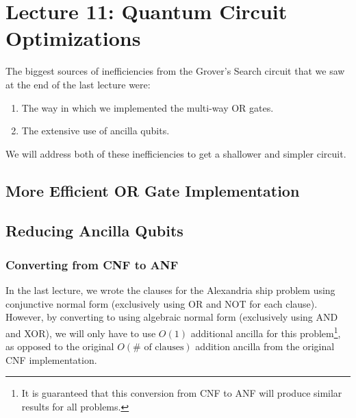 \section{Lecture 11: Quantum Circuit Optimizations}\label{sec:lecture11}

The biggest sources of inefficiencies from the Grover's Search circuit that
we saw at the end of the last lecture were:

\begin{enumerate}
  \item The way in which we implemented the multi-way OR gates.

  \item The extensive use of ancilla qubits.
\end{enumerate}

We will address both of these inefficiencies to get a shallower and simpler
circuit.

\subsection*{More Efficient OR Gate Implementation}


\subsection*{Reducing Ancilla Qubits}

\subsubsection*{Converting from CNF to ANF}

In the last lecture, we wrote the clauses for the Alexandria ship problem using
conjunctive normal form (exclusively using OR and NOT for each clause). However,
by converting to using algebraic normal form (exclusively using AND and XOR), we
will only have to use $O(1)$ additional ancilla for this problem\footnote{It is
guaranteed that this conversion from CNF to ANF will produce similar results for
all problems.}, as opposed to the original $O(\text{# of clauses})$ addition
ancilla from the original CNF implementation.


